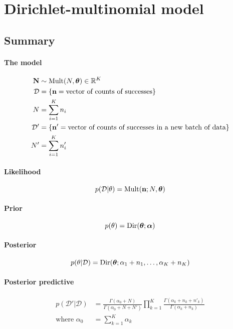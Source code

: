 \section{Dirichlet-multinomial model}
\subsection{Summary}
\paragraph{The model}
    \begin{align}
        \boldsymbol{\mathbf{N}}      &\sim \operatorname{Mult}(N, \boldsymbol{\mathbf{\theta}}) \in \mathbb R^K \\
        \mathcal D  &= \{\boldsymbol{\mathbf{n}} = \text{vector of counts of successes}\} \\
        N           &= \sum_{i = 1}^K n_i \\
        \mathcal D' &= \{\boldsymbol{\mathbf{n}}' = \text{vector of counts of successes in a new batch of data}\} \\
        N'          &= \sum_{i = 1}^K n'_i
    \end{align}

\paragraph{Likelihood}
    \begin{equation}
        p(\mathcal D | \theta) = \operatorname{Mult}(\boldsymbol{\mathbf{n}}; N, \boldsymbol{\mathbf{\theta}})
    \end{equation}

\paragraph{Prior}
    \begin{equation}
        p(\theta)   = \operatorname{Dir}(\boldsymbol{\mathbf{\theta}}; \boldsymbol{\mathbf{\alpha}})
    \end{equation}

\paragraph{Posterior}
    \begin{equation}
        p(\theta | \mathcal D) = \operatorname{Dir}(\boldsymbol{\mathbf{\theta}}; \alpha_1 + n_1, \dotsc, \alpha_K + n_K)
    \end{equation}

\paragraph{Posterior predictive}
    \begin{align}
        p(\mathcal D' | \mathcal D) &= \frac{\Gamma(\alpha_0 + N)}{\Gamma(\alpha_0 + N + N')} \prod_{k = 1}^K \frac{\Gamma(\alpha_k + n_k + n'_k)}{\Gamma(\alpha_k + n_k)} \\
        \text{where } \alpha_0 &= \sum_{k = 1}^K \alpha_k
    \end{align}

